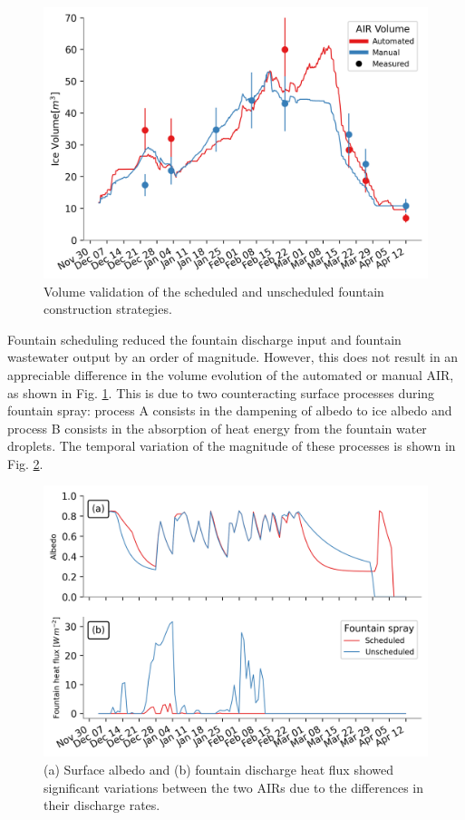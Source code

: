 \begin{figure}[htb] \includegraphics[width=\textwidth] {figs/CH_validation.png} \caption{Volume validation of the
		scheduled and unscheduled fountain construction strategies.} \label{fig:validation} \end{figure}

Fountain scheduling reduced the fountain discharge input and fountain wastewater output by an order of
magnitude. However, this does not result in an appreciable difference in the volume evolution of the automated
or manual AIR, as shown in Fig. \ref{fig:validation}. This is due to two counteracting surface processes
during fountain spray: process A consists in the dampening of albedo to ice albedo and process B consists in the
absorption of heat energy from the fountain water droplets. The temporal variation of the magnitude of these
processes is shown in Fig. \ref{fig:dis_processes}.

\begin{figure}[htb]
	\includegraphics[width=\textwidth]{figs/dis_processes.png}
	\caption{(a) Surface albedo  and (b) fountain discharge heat flux showed significant variations between the two
		\ac{AIRs} due to the differences in their discharge rates.}
	\label{fig:dis_processes}
\end{figure}

